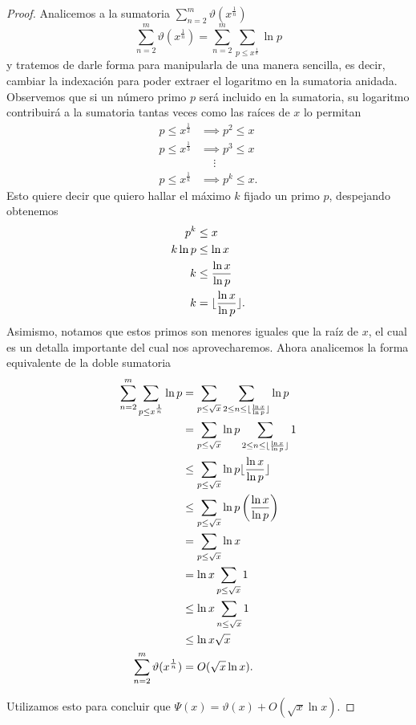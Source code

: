 \documentclass{article}
\DeclarePairedDelimiter\floor{\lfloor}{\rfloor}
\theoremstyle{definition}
\theoremstyle{remark}
\begin{document}
\begin{proof}
Analicemos a la sumatoria $\sum_{n = 2}^m \vartheta(x^\frac{1}{n})$
$$\sum_{n = 2}^m \vartheta(x^\frac{1}{n}) = \sum_{n = 2}^m \sum_{p \leq x^\frac{1}{n}} \ln p$$
y tratemos de darle forma para manipularla de una manera sencilla, es decir,
cambiar la indexaci\'on para poder extraer el logaritmo en la sumatoria anidada.
Observemos que si un n\'umero primo $p$ ser\'a incluido en la sumatoria, su logaritmo contribuir\'a a la sumatoria
tantas veces como las ra\'ices de $x$ lo permitan
\begin{align*}
p \leq x^\frac{1}{2} &\implies p^2 \leq x \\
p \leq x^\frac{1}{3} &\implies p^3 \leq x \\
&\,\,\,\,\,\,\,\vdots \\
p \leq x^\frac{1}{k} &\implies p^k \leq x.
\end{align*}
Esto quiere decir que quiero hallar el m\'aximo $k$ fijado un primo $p$, despejando obtenemos
\begin{align*}
p^k &\leq x \\
k \ln p &\leq \ln x \\
k &\leq \frac{\ln x}{\ln p} \\
k &= \floor{\frac{\ln x}{\ln p}}.
\end{align*}
Asimismo, notamos que estos primos son menores iguales que la ra\'iz de $x$, el cual es un detalla importante del cual nos aprovecharemos.
Ahora analicemos la forma equivalente de la doble sumatoria
\begin{align*}
\sum_{n = 2}^m \sum_{p \leq x^\frac{1}{n}} \ln p &= \sum_{p \leq \sqrt{x}} \sum_{2 \leq n \leq \floor{\frac{\ln x}{\ln p}}} \ln p \\
&= \sum_{p \leq \sqrt{x}} \ln p \sum_{2 \leq n \leq \floor{\frac{\ln x}{\ln p}}} 1 \\
&\leq \sum_{p \leq \sqrt{x}} \ln p \floor{\frac{\ln x}{\ln p}} \\
&\leq \sum_{p \leq \sqrt{x}} \ln p \left(\frac{\ln x}{\ln p}\right) \\
&= \sum_{p \leq \sqrt{x}} \ln x \\
&= \ln x \sum_{p \leq \sqrt{x}} 1 \\
&\leq \ln x \sum_{n \leq \sqrt{x}} 1 \\
&\leq \ln x \sqrt{x} \\
\sum_{n = 2}^m \vartheta(x^\frac{1}{n}) &= O(\sqrt{x} \ln x).
\end{align*}

Utilizamos esto para concluir que $\Psi(x) = \vartheta(x) + O(\sqrt{x} \ln x)$.
\end{proof}
\end{document}
